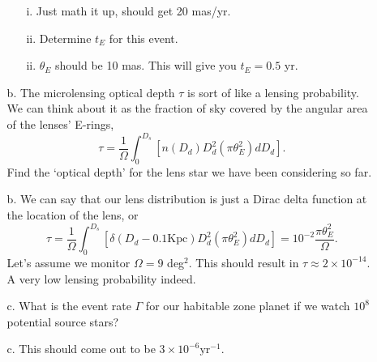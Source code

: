 \documentclass[12pt]{article}
\begin{document}
\begin{itemize}
\begin{itemize}
\begin{itemize}
\item[i.] Just math it up, should get 20 mas/yr.

\item[ii.] Determine $t_E$ for this event.
\item[ii.] $\theta_E$ should be 10 mas. This will give you $t_E=0.5$ yr. 
\end{itemize}
\item[b.] The microlensing optical depth $\tau$ is sort of like a lensing probability. We can think about it as the fraction of sky covered by the angular area of the lenses' E-rings,
\begin{equation}
\tau = \frac{1}{\Omega}\int_0^{D_s} \left[n(D_d)D_d^2(\pi\theta_E^2)dD_d\right].
\end{equation}
Find the `optical depth' for the lens star we have been considering so far. 
\item[b.] We can say that our lens distribution is just a Dirac delta function at the location of the lens, or 
\begin{equation}
\tau = \frac{1}{\Omega}\int_0^{D_s} \left[\delta(D_d-0.1\textrm{Kpc})D_d^2(\pi\theta_E^2)dD_d\right]=10^{-2}\frac{\pi\theta_E^2}{\Omega}.
\end{equation}
Let's assume we monitor $\Omega=9$ deg$^2$. This should result in $\tau\approx2\times10^{-14}$. A very low lensing probability indeed.
\item[c.] What is the event rate $\Gamma$ for our habitable zone planet if we watch $10^8$ potential source stars?
\item[c.] This should come out to be $3\times10^{-6}\textrm{yr}^{-1}$.
\end{itemize}
\end{itemize}
\end{document}
